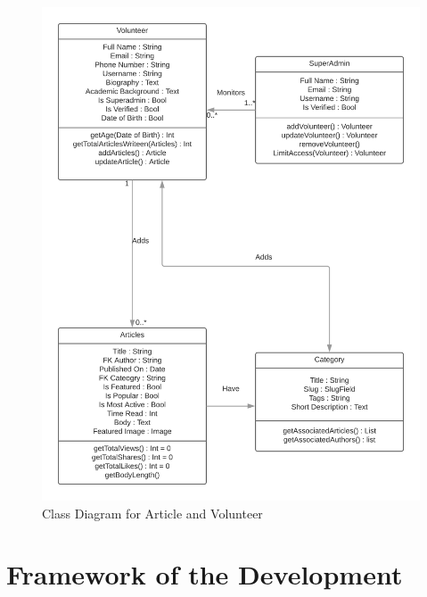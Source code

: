 \documentclass[12pt, a4paper, titlepage]{article}
\begin{document}
\begin{center}
\begin{figure}
\includegraphics[scale=0.5]{Class_Diagram_for_Election_Portal_2.png}
	\caption{Class Diagram for Article and Volunteer}
\end{figure}
\end{center}

\section{Framework of the Development}
\end{document}
